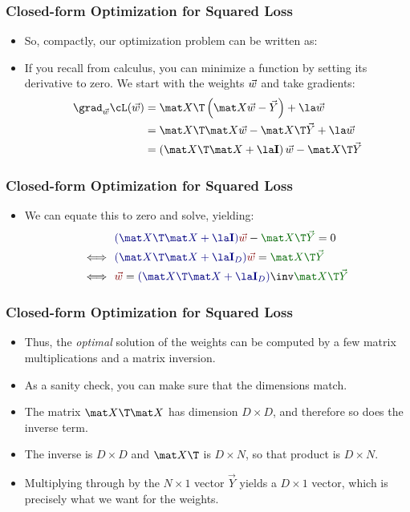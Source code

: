 \documentclass[trans,aspectratio=169]{beamer}
\begin{document}
\begin{frame}
  \frametitle{Closed-form Optimization for Squared Loss}
\begin{itemize}
\item 
%
So, compactly, our optimization problem can be written as:
%
%
\item If you recall from calculus, you can minimize a function by setting
its derivative to zero.  We start with the weights ${\vec w}$ and take
gradients:
%
\begin{align}
\grad_\vw \cL(\vw)
&= \mat X \T \left( \mat X \vw - \vec Y \right) + \la \vw \\
&= \mat X \T \mat X \vw - \mat X \T \vec Y + \la \vw \\
&= \left( \mat X \T \mat X + \la \eye \right) \vw - \mat X \T \vec Y
\end{align}
%
\end{itemize}
\end{frame}

\begin{frame}
  \frametitle{Closed-form Optimization for Squared Loss}
\begin{itemize}
\item We can equate this to zero and solve, yielding:
%
\begin{align}
     & \textcolor{darkblue}{\left( \mat X \T \mat X + \la \eye \right)} \textcolor{darkred}{\vw} - \textcolor{darkergreen}{\mat X \T \vec Y} = 0\\
\myiff~~ & \textcolor{darkblue}{\left( \mat X \T \mat X + \la \eye_D \right)} \textcolor{darkred}{\vw} = \textcolor{darkergreen}{\mat X \T \vec Y} \\
\myiff~~ & \textcolor{darkred}{\vw} = \textcolor{darkblue}{\left( \mat X \T \mat X + \la \eye_D \right)}\inv \textcolor{darkergreen}{\mat X \T \vec Y}
\end{align}
%
\end{itemize}
\end{frame}

\begin{frame}
  \frametitle{Closed-form Optimization for Squared Loss}
\begin{itemize}
\item Thus, the \emph{optimal} solution of the weights can be computed by a
few matrix multiplications and a matrix inversion.
%
\item As a sanity check, you can make sure that the dimensions match.
\item  The
matrix $\mat X\T\mat X$ has dimension $D\times D$, and therefore so
does the inverse term.  
\item The inverse is $D\times D$ and $\mat X\T$ is
$D\times N$, so that product is $D\times N$.  
\item Multiplying through by
the $N\times 1$ vector $\vec Y$ yields a $D \times 1$ vector, which is
precisely what we want for the weights.
\end{itemize}
\end{frame}
\end{document}
